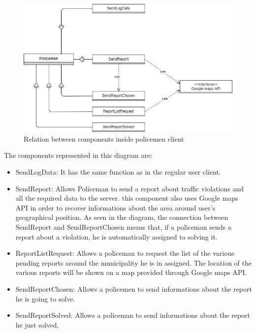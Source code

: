 \begin{figure}[h!]
	\centering
	\includegraphics[scale=0.7]{Images/PolicemenClient}
	\caption{Relation between components inside policemen client}
\end{figure}
The components represented in this diagram are:
\begin{itemize}
	\item SendLogData: It has the same function as in the regular user client.
	\item SendReport: Allows Policeman to send a report about traffic violations and all the required data to the server.
	this component also uses Google maps API in order to recover informations about the area around user's geographical position.
	As seen in the diagram, the connection between SendReport and SendReportChosen means that, if a policeman sends a report about a violation, he is automatically assigned to solving it.
	\item ReportListRequest: Allows a policeman to request the list of the various pending reports around the municipality  he is in assigned.
	The location of the various reports will be shown on a map provided through Google maps API.
	\item SendReportChosen: Allows a policemen to send informations about the report he is going to solve.
	\item SendReportSolved: Allows a policeman to send informations about the report he just solved.
\end{itemize}

